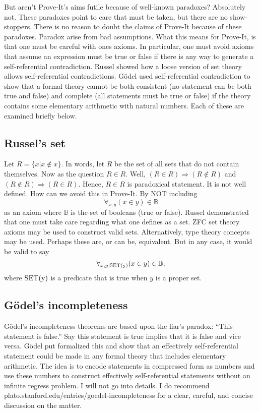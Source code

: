 \documentclass[12pt]{article}
\begin{document}
But aren't Prove-It's aims futile because of well-known paradoxes?  Absolutely not.  These paradoxes point to care that must be taken, but there are no show-stoppers.  There is no reason to doubt the claims of Prove-It because of these paradoxes.  Paradox arise from bad assumptions.  What this means for Prove-It, is that one must be careful with ones axioms.  In particular, one must avoid axioms that assume an expression must be true or false if there is any way to generate a self-referential contradiction.  Russel showed how a loose version of set theory allows self-referential contradictions.  G\"odel used self-referential contradiction to show that a formal theory cannot be both consistent (no statement can be both true and false) and complete (all statements must be true or false) if the theory contains some elementary arithmetic with natural numbers.  Each of these are examined briefly below.

\subsection{Russel's set}

Let $R = \{x | x \notin x\}$.  In words, let $R$ be the set of all sets that do not contain themselves.  Now as the question $R \in R$.  Well, $(R \in R) \Rightarrow (R \notin R)$ and $(R \notin R) \Rightarrow (R \in R)$.  Hence, $R \in R$ is paradoxical statement.  It is not well defined.  How can we avoid this in Prove-It.  By NOT including
\begin{equation}
\forall_{x, y} (x \in y) \in \mathbb{B}
\end{equation}
as an axiom where $\mathbb{B}$ is the set of booleans (true or false).  Russel demonstrated that one must take care regarding what one defines as a set.  ZFC set theory axioms may be used to construct valid sets.  Alternatively, type theory concepts may be used.  Perhaps these are, or can be, equivalent.  But in any case, it would be valid to say
\begin{equation}
\forall_{x, y | \rm{SET}(y)} (x \in y) \in \mathbb{B},
\end{equation}
where $\rm{SET}(y)$ is a predicate that is true when $y$ is a proper set.

\subsection{G\"odel's incompleteness}

G\"odel's incompleteness theorems are based upon the liar's paradox: ``This statement is false.''  Say this statement is true implies that it is false and vice versa.  G\"odel put formalized this and show that an effectively self-referential statement could be made in any formal theory that includes elementary arithmetic.  The idea is to encode statements in compressed form as numbers and use these numbers to construct effectively self-referential statements without an infinite regress problem.  I will not go into details.  I do recommend plato.stanford.edu/entries/goedel-incompleteness for a clear, careful, and concise discussion on the matter.
\end{document}
